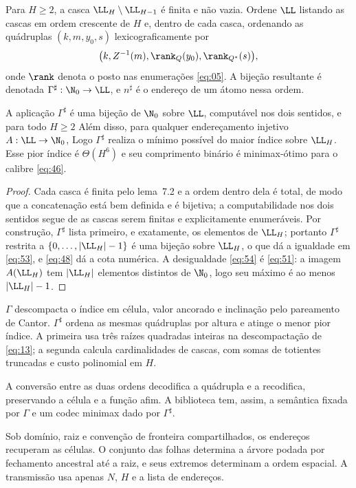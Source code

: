 \begin{definicao}
Para $H\ge2$, a casca $\LL_H\setminus\LL_{H-1}$ é finita e não vazia. Ordene $\LL$ listando as cascas em ordem crescente de $H$ e, dentro de cada casca, ordenando as quádruplas $(k,m,y_0,s)$ lexicograficamente por
\[
\bigl(k,Z^{-1}(m),\rank_Q(y_0),\rank_{Q^*}(s)\bigr),
\]
onde $\rank$ denota o posto nas enumerações \eqref{eq:05}. A bijeção resultante é denotada $\Gamma^\sharp:\N_0\to\LL$, e $n^\sharp$ é o endereço de um átomo nessa ordem.
\end{definicao}

\begin{teorema}
A aplicação $\Gamma^\sharp$ é uma bijeção de $\N_0$ sobre $\LL$, computável nos dois sentidos, e para todo $H\ge2$
Além disso, para qualquer endereçamento injetivo $A:\LL\to\N_0$,
Logo $\Gamma^\sharp$ realiza o mínimo possível do maior índice sobre $\LL_H$. Esse pior índice é $\Theta(H^6)$ e seu comprimento binário é minimax-ótimo para o calibre \eqref{eq:46}.
\end{teorema}
\begin{proof}
Cada casca é finita pelo lema~7.2 e a ordem dentro dela é total, de modo que a concatenação está bem definida e é bijetiva; a computabilidade nos dois sentidos segue de as cascas serem finitas e explicitamente enumeráveis. Por construção, $\Gamma^\sharp$ lista primeiro, e exatamente, os elementos de $\LL_H$; portanto $\Gamma^\sharp$ restrita a $\{0,\ldots,|\LL_H|-1\}$ é uma bijeção sobre $\LL_H$, o que dá a igualdade em \eqref{eq:53}, e \eqref{eq:48} dá a cota numérica. A desigualdade \eqref{eq:54} é \eqref{eq:51}: a imagem $A(\LL_H)$ tem $|\LL_H|$ elementos distintos de $\N_0$, logo seu máximo é ao menos $|\LL_H|-1$.
\end{proof}

\begin{observacao}
$\Gamma$ descompacta o índice em célula, valor ancorado e inclinação pelo pareamento de Cantor. $\Gamma^\sharp$ ordena as mesmas quádruplas por altura e atinge o menor pior índice. A primeira usa três raízes quadradas inteiras na descompactação de \eqref{eq:13}; a segunda calcula cardinalidades de cascas, com somas de totientes truncadas e custo polinomial em $H$.

A conversão entre as duas ordens decodifica a quádrupla e a recodifica, preservando a célula e a função afim. A biblioteca tem, assim, a semântica fixada por $\Gamma$ e um codec minimax dado por $\Gamma^\sharp$.
\end{observacao}
Sob domínio, raiz e convenção de fronteira compartilhados, os endereços recuperam as células. O conjunto das folhas determina a árvore podada por fechamento ancestral até a raiz, e seus extremos determinam a ordem espacial. A transmissão usa apenas $N$, $H$ e a lista de endereços.

